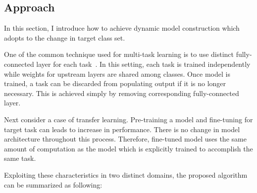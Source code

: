 \documentclass{article}
\begin{document}

\subsection{Approach}

In this section, I introduce how to achieve dynamic model construction which adopts to the change in target class set.

One of the common technique used for multi-task learning is to use distinct fully-connected layer for each task~\cite{huang2016mtnet, girshick2015fast, long2017learning}. In this setting, each task is trained independently while weights for upstream layers are shared among classes. Once model is trained, a task can be discarded from populating output if it is no longer necessary. This is achieved simply by removing corresponding fully-connected layer.

Next consider a case of transfer learning. Pre-training a model and fine-tuning for target task can leads to increase in performance. There is no change in model architecture throughout this process. Therefore, fine-tuned model uses the same amount of computation as the model which is explicitly trained to accomplish the same task.

Exploiting these characteristics in two distinct domains, the proposed algorithm can be summarized as following:
\end{document}
